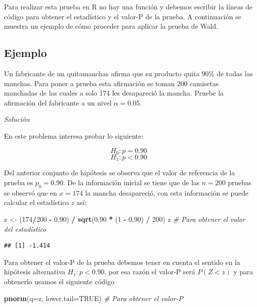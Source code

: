 \documentclass[10pt,]{krantz}
\makeatletter
\newenvironment{Shaded}{\begin{snugshade}}{\end{snugshade}}
\newcommand{\KeywordTok}[1]{\textcolor[rgb]{0.13,0.29,0.53}{\textbf{#1}}}
\newcommand{\DataTypeTok}[1]{\textcolor[rgb]{0.13,0.29,0.53}{#1}}
\newcommand{\DecValTok}[1]{\textcolor[rgb]{0.00,0.00,0.81}{#1}}
\newcommand{\FloatTok}[1]{\textcolor[rgb]{0.00,0.00,0.81}{#1}}
\newcommand{\StringTok}[1]{\textcolor[rgb]{0.31,0.60,0.02}{#1}}
\newcommand{\CommentTok}[1]{\textcolor[rgb]{0.56,0.35,0.01}{\textit{#1}}}
\newcommand{\OtherTok}[1]{\textcolor[rgb]{0.56,0.35,0.01}{#1}}
\newcommand{\OperatorTok}[1]{\textcolor[rgb]{0.81,0.36,0.00}{\textbf{#1}}}
\newcommand{\NormalTok}[1]{#1}
\newenvironment{kframe}{%
\medskip{}
\setlength{\fboxsep}{.8em}
 \def\at@end@of@kframe{}%
 \ifinner\ifhmode%
  \def\at@end@of@kframe{\end{minipage}}%
  \begin{minipage}{\columnwidth}%
 \fi\fi%
 \def\FrameCommand##1{\hskip\@totalleftmargin \hskip-\fboxsep
 \colorbox{shadecolor}{##1}\hskip-\fboxsep
     \hskip-\linewidth \hskip-\@totalleftmargin \hskip\columnwidth}%
 \MakeFramed {\advance\hsize-\width
   \@totalleftmargin\z@ \linewidth\hsize
   \@setminipage}}%
 {\par\unskip\endMakeFramed%
 \at@end@of@kframe}
\renewenvironment{Shaded}{\begin{kframe}}{\end{kframe}}
\makeatother
\begin{document}
Para realizar esta prueba en R no hay una función y debemos escribir la
líneas de código para obtener el estadístico y el valor-P de la prueba.
A continuación se muestra un ejemplo de cómo proceder para aplicar la
prueba de Wald.

\subsection*{Ejemplo}\label{ejemplo-65}


Un fabricante de un quitamanchas afirma que su producto quita 90\% de
todas las manchas. Para poner a prueba esta afirmación se toman 200
camisetas manchadas de las cuales a solo 174 les desapareció la mancha.
Pruebe la afirmación del fabricante a un nivel \(\alpha=0.05\).

\emph{Solución}

En este problema interesa probar lo siguiente:

\[H_0: p = 0.90\] \[H_1: p < 0.90\]

Del anterior conjunto de hipótesis se observa que el valor de referencia
de la prueba es \(p_0=0.90\). De la información inicial se tiene que de
las \(n=200\) pruebas se observó que en \(x=174\) la mancha desapareció,
con esta información se puede calcular el estadístico \(z\) así:

\begin{Shaded}
\begin{Highlighting}[]
\NormalTok{z <-}\StringTok{ }\NormalTok{(}\DecValTok{174}\OperatorTok{/}\DecValTok{200} \OperatorTok{-}\StringTok{ }\FloatTok{0.90}\NormalTok{) }\OperatorTok{/}\StringTok{ }\KeywordTok{sqrt}\NormalTok{(}\FloatTok{0.90} \OperatorTok{*}\StringTok{ }\NormalTok{(}\DecValTok{1} \OperatorTok{-}\StringTok{ }\FloatTok{0.90}\NormalTok{) }\OperatorTok{/}\StringTok{ }\DecValTok{200}\NormalTok{)}
\NormalTok{z  }\CommentTok{# Para obtener el valor del estadístico}
\end{Highlighting}
\end{Shaded}

\begin{verbatim}
## [1] -1.414
\end{verbatim}

Para obtener el valor-P de la prueba debemos tener en cuenta el sentido
en la hipótesis alternativa \(H_1: p < 0.90\), por esa razón el valor-P
será \(P(Z<z)\) y para obtenerlo usamos el siguiente código

\begin{Shaded}
\begin{Highlighting}[]
\KeywordTok{pnorm}\NormalTok{(}\DataTypeTok{q=}\NormalTok{z, }\DataTypeTok{lower.tail=}\OtherTok{TRUE}\NormalTok{)  }\CommentTok{# Para obtener el valor-P}
\end{Highlighting}
\end{Shaded}
\end{document}
